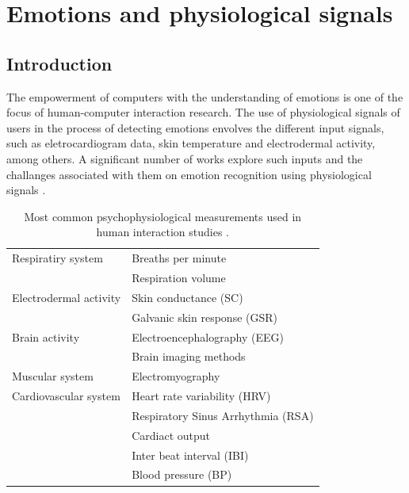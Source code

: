 \chapter{Emotions and physiological signals}

\section{Introduction}

The empowerment of computers with the understanding of emotions is one of the focus of human-computer interaction research. The use of physiological signals of users in the process of detecting emotions envolves the different input signals, such as eletrocardiogram data, skin temperature and electrodermal activity, among others. A significant number of works explore such inputs and the challanges associated with them on emotion recognition using physiological signals \parencite{jerritta2011physiological}.


\begin{table}[h]
\begin{tabular}{L{.4\linewidth}L{.5\linewidth}}%
\toprule%
Respiratiry system & Breaths per minute\\
 & Respiration volume \\
\midrule
 Electrodermal activity & Skin conductance (SC) \\
 & Galvanic skin response (GSR) \\
\midrule
Brain activity & Electroencephalography (EEG) \\
& Brain imaging methods \\
\midrule
Muscular system & Electromyography \\
\midrule
Cardiovascular system & Heart rate variability (HRV) \\
& Respiratory Sinus Arrhythmia (RSA)  \\
& Cardiact output  \\
& Inter beat interval (IBI) \\
& Blood pressure (BP)  \\
\bottomrule%
\end{tabular}%
\caption{Most common psychophysiological measurements used in human interaction studies \parencite{jerritta2011physiological}.}
\label{table:physiological-signals}
\end{table}

